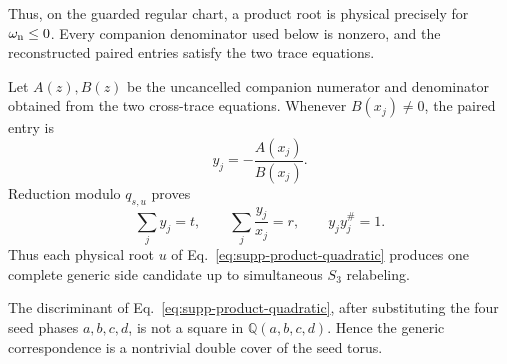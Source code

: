 Thus, on the guarded regular chart, a product root is physical precisely for $\omega_{\rm n}\leq0$. Every companion denominator used below is nonzero, and the reconstructed paired entries satisfy the two trace equations.

Let $A(z),B(z)$ be the uncancelled companion numerator and denominator obtained from the two cross-trace equations.  Whenever $B(x_j)\ne0$, the paired entry is
\begin{equation}
y_j=-\frac{A(x_j)}{B(x_j)}.
\label{eq:supp-companion}
\end{equation}
Reduction modulo $q_{s,u}$ proves
\begin{equation}
\sum_jy_j=t,\qquad \sum_j\frac{y_j}{x_j}=r,\qquad
y_jy_j^\#=1.
\label{eq:supp-companion-traces}
\end{equation}
Thus each physical root $u$ of Eq.~\eqref{eq:supp-product-quadratic} produces one complete generic side candidate up to simultaneous $S_3$ relabeling.


\begin{proposition}
\label{prop:supp-nonsplit}
The discriminant of Eq.~\eqref{eq:supp-product-quadratic}, after substituting the four seed phases $a,b,c,d$, is not a square in $\mathbb Q(a,b,c,d)$.  Hence the generic correspondence is a nontrivial double cover of the seed torus.
\end{proposition}

